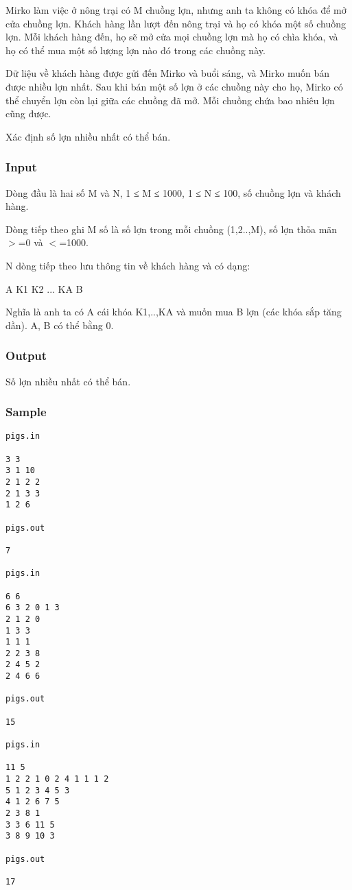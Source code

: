 



   Mirko làm việc ở nông trại có M chuồng lợn, nhưng anh ta không có khóa  để mở cửa chuồng lợn. Khách hàng lần lượt đến nông trại và họ có khóa một số chuồng lợn. Mỗi khách hàng đến, họ sẽ mở cửa mọi chuồng lợn mà họ có chìa khóa, và  họ có thể mua một số lượng lợn nào đó trong các chuồng này.  

   Dữ liệu về khách hàng được gửi đến Mirko và buổi sáng, và Mirko muốn bán  được nhiều lợn nhất. Sau khi bán một số lợn ở các chuồng này cho họ, Mirko có thể  chuyển lợn còn lại giữa các chuồng đã mở.  Mỗi chuồng chứa bao nhiêu lợn cũng được.  

   Xác định số lợn nhiều nhất có thể bán.  



\subsubsection{   Input  }

   Dòng đầu là hai số M và N, 1 ≤ M ≤ 1000, 1 ≤ N ≤ 100, số chuồng lợn và khách hàng.  

   Dòng tiếp theo ghi M số là số lợn trong mỗi chuồng (1,2..,M), số lợn thỏa mãn $>$=0 và $<$=1000.  

   N dòng tiếp theo lưu thông tin về khách hàng và có dạng:  

   A K1 K2 ... KA B  

   Nghĩa là anh ta có A cái khóa K1,..,KA và muốn mua B lợn (các khóa sắp  tăng dần). A, B có thể bằng 0.  

\subsubsection{   Output  }

   Số lợn nhiều nhất có thể bán.  

\subsubsection{   Sample  }
\begin{verbatim}
pigs.in 
 
3 3 
3 1 10 
2 1 2 2 
2 1 3 3 
1 2 6 
 
pigs.out
 
7 

pigs.in 
 
6 6 
6 3 2 0 1 3 
2 1 2 0 
1 3 3 
1 1 1 
2 2 3 8 
2 4 5 2 
2 4 6 6 
 
pigs.out 
 
15 

pigs.in 
 
11 5 
1 2 2 1 0 2 4 1 1 1 2 
5 1 2 3 4 5 3 
4 1 2 6 7 5 
2 3 8 1 
3 3 6 11 5 
3 8 9 10 3 
 
pigs.out 
 
17  

\end{verbatim}